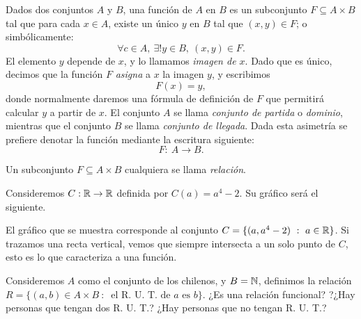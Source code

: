 \begin{defn}
Dados dos conjuntos $A$ y $B$, una función de $A$ en $B$ es un subconjunto $F\subseteq A\times B$ tal que para cada $x\in A$, existe un único $y$ en $B$ tal que $(x,y)\in F$; o simbólicamente:
$$\forall c\in A,\ \exists! y\in B,\ (x,y)\in F.$$
El elemento $y$ depende de $x$, y lo llamamos \emph{imagen de $x$}.
Dado que es único, decimos que la función $F$ \emph{asigna} a $x$ la imagen $y$, y escribimos 
$$F(x)=y,$$
donde normalmente daremos una fórmula de definición de $F$ que permitirá calcular $y$ a partir de $x$.
El conjunto $A$ se llama \emph{conjunto de partida} o \emph{dominio}, mientras que el conjunto $B$ se llama \emph{conjunto de llegada}.
Dada esta asimetría se prefiere denotar la función mediante la escritura siguiente:
$$ F:\ A\longrightarrow B.$$

Un subconjunto $F\subseteq A\times B$ cualquiera se llama \emph{relación}.
\end{defn}

\begin{ejemplo}\label{eje:C}
Consideremos $C:\mathbb{R}\rightarrow \mathbb{R}$ definida por $C(a)=a^4-2$.
Su gráfico será el siguiente.
\begin{center}
\end{center}
El gráfico que se muestra corresponde al conjunto $C=\{(a,a^4-2)\ :\ a\in \mathbb{R}\}$.
Si trazamos una recta vertical, vemos que siempre intersecta a un solo punto de $C$, esto es lo que caracteriza a una función.
\end{ejemplo}

\vspace{.2cm}

\begin{ejemplo}
Consideremos $A$ como el conjunto de los chilenos, y $B=\mathbb{N}$, definimos la relación $R=\{(a,b)\in A\times B\ :\ \textrm{ el R. U. T. de } a \textrm{ es } b\}$. ¿Es una relación funcional? ?¿Hay personas que tengan dos R. U. T.? ¿Hay personas que no tengan R. U. T.?
\end{ejemplo}


